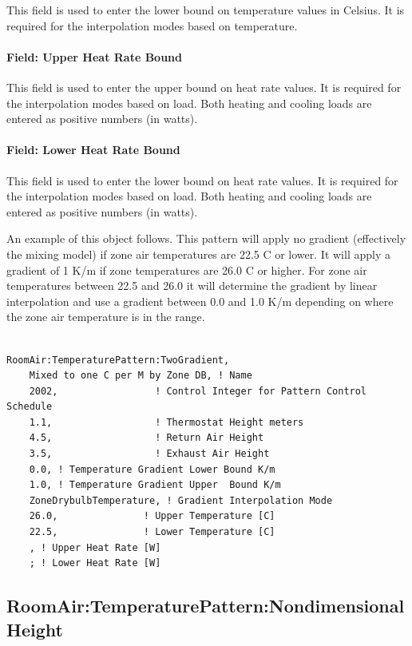 This field is used to enter the lower bound on temperature values in Celsius. It is required for the interpolation modes based on temperature.

\paragraph{Field: Upper Heat Rate Bound}\label{field-upper-heat-rate-bound}

This field is used to enter the upper bound on heat rate values. It is required for the interpolation modes based on load. Both heating and cooling loads are entered as positive numbers (in watts).

\paragraph{Field: Lower Heat Rate Bound}\label{field-lower-heat-rate-bound}

This field is used to enter the lower bound on heat rate values. It is required for the interpolation modes based on load. Both heating and cooling loads are entered as positive numbers (in watts).

An example of this object follows. This pattern will apply no gradient (effectively the mixing model) if zone air temperatures are 22.5 C or lower. It will apply a gradient of 1 K/m if zone temperatures are 26.0 C or higher. For zone air temperatures between 22.5 and 26.0 it will determine the gradient by linear interpolation and use a gradient between 0.0 and 1.0 K/m depending on where the zone air temperature is in the range.

\begin{lstlisting}

RoomAir:TemperaturePattern:TwoGradient,
    Mixed to one C per M by Zone DB, ! Name
    2002,                 ! Control Integer for Pattern Control Schedule
    1.1,                  ! Thermostat Height meters
    4.5,                  ! Return Air Height
    3.5,                  ! Exhaust Air Height
    0.0, ! Temperature Gradient Lower Bound K/m
    1.0, ! Temperature Gradient Upper  Bound K/m
    ZoneDrybulbTemperature, ! Gradient Interpolation Mode
    26.0,               ! Upper Temperature [C]
    22.5,               ! Lower Temperature [C]
    , ! Upper Heat Rate [W]
    ; ! Lower Heat Rate [W]
\end{lstlisting}

\subsection{RoomAir:TemperaturePattern:NondimensionalHeight}\label{roomairtemperaturepatternnondimensionalheight}

